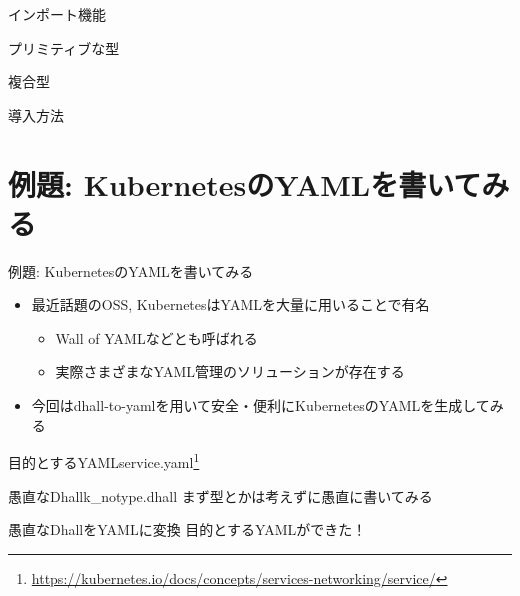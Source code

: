 \documentclass[unicode,12pt]{beamer}
\begin{document}
\begin{frame}{インポート機能}

\end{frame}

\begin{frame}{プリミティブな型}

\end{frame}

\begin{frame}{複合型}

\end{frame}

\begin{frame}{導入方法}

\end{frame}

\section{例題: KubernetesのYAMLを書いてみる}

\begin{frame}{例題: KubernetesのYAMLを書いてみる}
  \begin{itemize}
  \item 最近話題のOSS, KubernetesはYAMLを大量に用いることで有名
    \begin{itemize}
    \item Wall of YAMLなどとも呼ばれる
    \item 実際さまざまなYAML管理のソリューションが存在する
    \end{itemize}
  \item 今回は{\ttfamily dhall-to-yaml}を用いて安全・便利にKubernetesのYAMLを生成してみる
  \end{itemize}
\end{frame}

\begin{frame}{目的とするYAML}{{\ttfamily service.yaml}\footnote{\url{https://kubernetes.io/docs/concepts/services-networking/service/}}}
  
\end{frame}

\begin{frame}{愚直なDhall}{\ttfamily k\_notype.dhall}
  まず型とかは考えずに愚直に書いてみる
  
\end{frame}

\begin{frame}{愚直なDhallをYAMLに変換}
  目的とするYAMLができた！
  
\end{frame}
\end{document}

